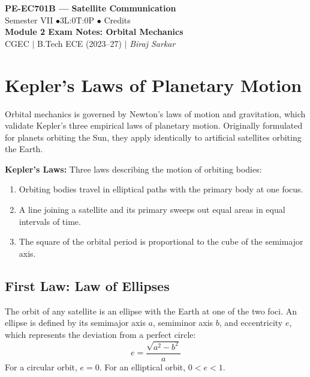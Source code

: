 \documentclass[12pt,a4paper]{article}
\begin{document}

\begin{center}
  {\LARGE\bfseries\color{myred} PE-EC701B --- Satellite Communication}\\[5pt]
  {\normalsize\color{mydark} Semester VII \quad$\bullet$\quad 3L:0T:0P \quad$\bullet$ Credits}\\[3pt]
  {\normalsize\color{myteal}\textbf{Module 2 Exam Notes: Orbital Mechanics}}\\[3pt]
  {\small\color{mydark} CGEC \;$|$\; B.Tech ECE (2023--27) \;$|$\; \textit{Biraj Sarkar}}
\end{center}
\vspace{2pt}
\noindent{\color{myred}\rule{\linewidth}{1.5pt}}
\vspace{2pt}

\hypersetup{linkcolor=mydark}
\tableofcontents
\hypersetup{linkcolor=myteal}
\newpage

\section{Kepler's Laws of Planetary Motion}

Orbital mechanics is governed by Newton's laws of motion and gravitation, which validate Kepler's three empirical laws of planetary motion. Originally formulated for planets orbiting the Sun, they apply identically to artificial satellites orbiting the Earth.

\begin{tcolorbox}[defbox]
\textbf{Kepler's Laws:} Three laws describing the motion of orbiting bodies:
\begin{enumerate}[label=\textbf{\arabic*.}, leftmargin=*, noitemsep, topsep=2pt]
  \item Orbiting bodies travel in elliptical paths with the primary body at one focus.
  \item A line joining a satellite and its primary sweeps out equal areas in equal intervals of time.
  \item The square of the orbital period is proportional to the cube of the semimajor axis.
\end{enumerate}
\end{tcolorbox}

\subsection{First Law: Law of Ellipses}
The orbit of any satellite is an ellipse with the Earth at one of the two foci. An ellipse is defined by its semimajor axis $a$, semiminor axis $b$, and eccentricity $e$, which represents the deviation from a perfect circle:
\begin{equation}
  e = \frac{\sqrt{a^2 - b^2}}{a}
\end{equation}
For a circular orbit, $e = 0$. For an elliptical orbit, $0 < e < 1$.
\end{document}
